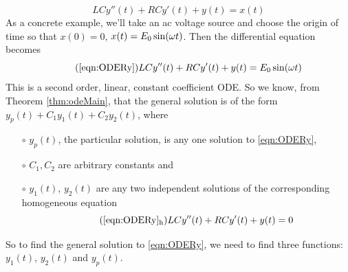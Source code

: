 \begin{eg}
\begin{equation*}
 LCy''(t) + RCy'(t) + y(t) = x(t)
\end{equation*}
As a concrete example, we'll take  an ac voltage source and choose the 
origin of time so that $x(0)=0$, $x(t)=E_0\sin(\omega t)$. Then the differential equation becomes
\label{eqn:ODERy}
\begin{equation}\tag{\ref{eqn:ODERy}}
LCy''(t)+RCy'(t)+y(t)=E_0\sin(\om t)
\end{equation}
This is a second order, linear, constant coefficient ODE. So we know, 
from Theorem \ref{thm:odeMain}, that the general solution is of the form 
$y_p(t)+C_1y_1(t)+C_2y_2(t)$, where 
\begin{itemize}\itemsep1pt \parskip0pt  %
\item[$\circ$]
 $y_p(t)$, the particular solution, is any one solution
to  \eqref{eqn:ODERy},
\item[$\circ$]
$C_1,C_2$ are arbitrary
constants and 
\item[$\circ$]
$y_1(t)$, $y_2(t)$ are any two independent solutions of the corresponding
homogeneous equation
\begin{equation}\tag{\ref{eqn:ODERy}$_{\rm h}$}
LCy''(t)+RCy'(t)+y(t)=0
\end{equation}
\end{itemize}
So to find the general solution to \eqref{eqn:ODERy}, we need to find 
three functions: $y_1(t)$, $y_2(t)$ and $y_p(t)$.


\end{eg}
